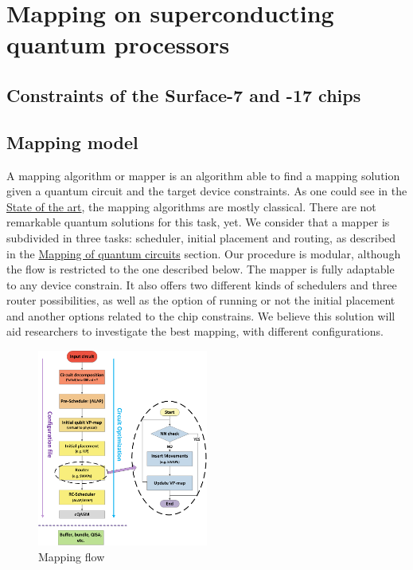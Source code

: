 
\chapter*{Mapping on superconducting quantum processors}
\label{sec:orgb505949}
\section*{Constraints of the Surface-7 and -17 chips}
\label{sec:org543f39f}


\section*{Mapping model}
\label{sec:org5ea284a}
A mapping algorithm or mapper is an algorithm able to find a mapping solution given a quantum circuit and the target device constraints.
As one could see in the \href{chapter-2.org}{State of the art}, the mapping algorithms are mostly classical.
There are not remarkable quantum solutions for this task, yet.
We consider that a mapper is subdivided in three tasks: scheduler, initial placement and routing, as described in the \href{chapter-2.org}{Mapping of quantum circuits} section.
Our procedure is modular, although the flow is restricted to the one described below.
The mapper is fully adaptable to any device constrain.
It also offers two different kinds of schedulers and three router possibilities, as well as the option of running or not the initial placement and another options related to the chip constrains.
We believe this solution will aid researchers to investigate the best mapping, with different configurations.

\begin{figure}[htbp]
\centering
\includegraphics[width=0.5\textwidth]{figures/mapping_flow2.png}
\caption{\label{fig:org2497b30}
Mapping flow}
\end{figure}

